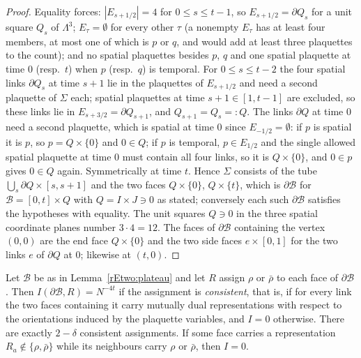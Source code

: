 \begin{proof}
Equality forces: $|E_{s+1/2}|=4$ for $0\le s\le t-1$, so $E_{s+1/2}=
\partial Q_s$ for a unit square $Q_s$ of $\Lambda^3$; $E_\tau=\emptyset$
for every other $\tau$ (a nonempty $E_\tau$ has at least four members, at
most one of which is $p$ or $q$, and would add at least three plaquettes
to the count); and no spatial plaquettes besides $p$, $q$ and one spatial
plaquette at time $0$ (resp.\ $t$) when $p$ (resp.\ $q$) is temporal. For
$0\le s\le t-2$ the four spatial links $\partial Q_s$ at time $s+1$ lie in
the plaquettes of $E_{s+1/2}$ and need a second plaquette of $\Sigma$
each; spatial plaquettes at time $s+1\in[1,t-1]$ are excluded, so these
links lie in $E_{s+3/2}=\partial Q_{s+1}$, and $Q_{s+1}=Q_s=:Q$. The links
$\partial Q$ at time $0$ need a second plaquette, which is spatial at time
$0$ since $E_{-1/2}=\emptyset$: if $p$ is spatial it is $p$, so $p=Q\times
\{0\}$ and $0\in Q$; if $p$ is temporal, $p\in E_{1/2}$ and the single
allowed spatial plaquette at time $0$ must contain all four links, so it
is $Q\times\{0\}$, and $0\in p$ gives $0\in Q$ again. Symmetrically at
time $t$. Hence $\Sigma$ consists of the tube $\bigcup_s\partial Q\times
[s,s+1]$ and the two faces $Q\times\{0\}$, $Q\times\{t\}$, which is
$\partial\mathcal B$ for $\mathcal B=[0,t]\times Q$ with $Q=I\times J\ni0$
as stated; conversely each such $\partial\mathcal B$ satisfies the
hypotheses with equality. The unit squares $Q\ni0$ in the three spatial
coordinate planes number $3\cdot4=12$. The faces of $\partial\mathcal B$
containing the vertex $(0,0)$ are the end face $Q\times\{0\}$ and the two
side faces $e\times[0,1]$ for the two links $e$ of $\partial Q$ at $0$;
likewise at $(t,0)$.
\end{proof}

\begin{lemma}\label{rEtwo:boxweight}
Let $\mathcal B$ be as in Lemma~\textup{\ref{rEtwo:plateau}} and let
$R$ assign $\rho$ or $\bar\rho$ to each face of $\partial\mathcal B$. Then
$I(\partial\mathcal B,R)=N^{-4t}$ if the assignment is \emph{consistent},
that is, if for every link the two faces containing it carry mutually
dual representations with respect to the orientations induced by the
plaquette variables, and $I=0$ otherwise. There are exactly $2-\delta$
consistent assignments. If some face carries a representation $R_a\notin
\{\rho,\bar\rho\}$ while its neighbours carry $\rho$ or $\bar\rho$, then
$I=0$.
\end{lemma}

